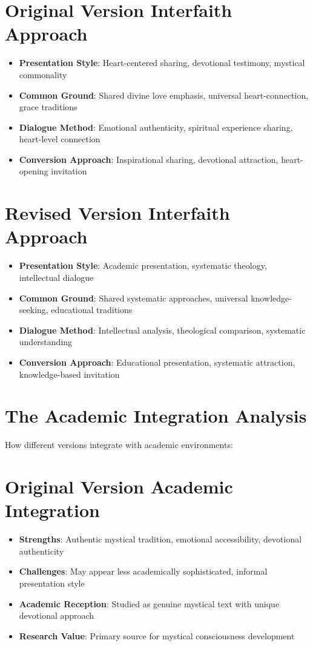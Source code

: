 \documentclass[11pt,twoside]{book}
\begin{document}
\section*{Original Version Interfaith Approach}
\label{sec:org3c85e1c}
\begin{itemize}
\item \textbf{\textbf{Presentation Style}}: Heart-centered sharing, devotional testimony, mystical commonality
\item \textbf{\textbf{Common Ground}}: Shared divine love emphasis, universal heart-connection, grace traditions
\item \textbf{\textbf{Dialogue Method}}: Emotional authenticity, spiritual experience sharing, heart-level connection
\item \textbf{\textbf{Conversion Approach}}: Inspirational sharing, devotional attraction, heart-opening invitation
\end{itemize}
\section*{Revised Version Interfaith Approach}
\label{sec:orgd9f062b}
\begin{itemize}
\item \textbf{\textbf{Presentation Style}}: Academic presentation, systematic theology, intellectual dialogue
\item \textbf{\textbf{Common Ground}}: Shared systematic approaches, universal knowledge-seeking, educational traditions
\item \textbf{\textbf{Dialogue Method}}: Intellectual analysis, theological comparison, systematic understanding
\item \textbf{\textbf{Conversion Approach}}: Educational presentation, systematic attraction, knowledge-based invitation
\end{itemize}
\section*{The Academic Integration Analysis}
\label{sec:orgb06cd8b}

How different versions integrate with academic environments:
\section*{Original Version Academic Integration}
\label{sec:orgcd37779}
\begin{itemize}
\item \textbf{\textbf{Strengths}}: Authentic mystical tradition, emotional accessibility, devotional authenticity
\item \textbf{\textbf{Challenges}}: May appear less academically sophisticated, informal presentation style
\item \textbf{\textbf{Academic Reception}}: Studied as genuine mystical text with unique devotional approach
\item \textbf{\textbf{Research Value}}: Primary source for mystical consciousness development
\end{itemize}
\end{document}
